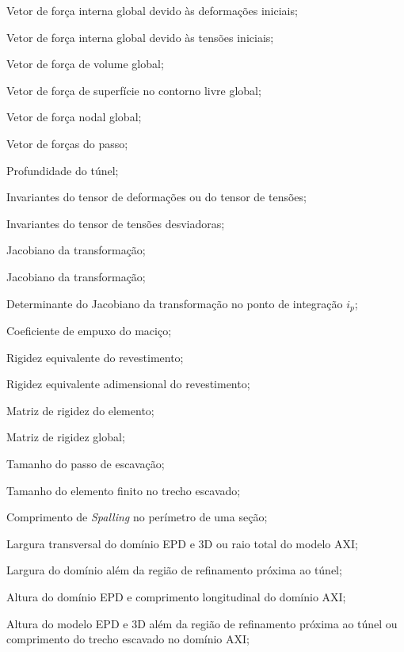 \item[$\Fl_{\varepsilon_{0}}$]	Vetor de força interna global devido às deformações iniciais;
\item[$\Fl_{\sigma_{0}}$]	Vetor de força interna global devido às tensões iniciais;
\item[$\Fl_{V}$]	Vetor de força de volume global;
\item[$\Fl_{S}$]	Vetor de força de superfície no contorno livre global;
\item[$\Fl_{N}$]	Vetor de força nodal global;

\item[$\Fl_{p}$]	Vetor de forças do passo;

\item[$H$]				Profundidade do túnel;
\item[$I_1,I_2,I_3$] 	Invariantes do tensor de deformações ou do tensor de tensões;
\item[$J_2,J_3$] 	Invariantes do tensor de tensões desviadoras;
\item[$J$] 		Jacobiano da transformação;
\item[$\Jll$] 		Jacobiano da transformação;
\item[$J_{i_p}$ ] 				Determinante do Jacobiano da transformação no ponto de integração $i_p$;
\item[$K$]				Coeficiente de empuxo do maciço;
\item[$K_{rev}$]			Rigidez equivalente do revestimento;
\item[$K_{rev}^*$]			Rigidez equivalente adimensional do revestimento;
\item[$\Kll_e$]			Matriz de rigidez do elemento;
\item[$\Kll$]			Matriz de rigidez global;
\item[$L_p$]			Tamanho do passo de escavação;
\item[$L_{p_e}$]		Tamanho do elemento finito no trecho escavado;
\item[$L_s$]			Comprimento de \textit{Spalling} no perímetro de uma seção;
\item[$L_x$]			Largura transversal do domínio EPD e 3D ou raio total do modelo AXI;
\item[$L_{x_1}$]			Largura do domínio além da região de refinamento próxima ao túnel;
\item[$L_y$]			Altura do domínio EPD e comprimento longitudinal do domínio AXI;
\item[$L_{y_1}$]			Altura do modelo EPD e 3D além da região de refinamento próxima ao túnel ou comprimento do trecho escavado no domínio AXI;
